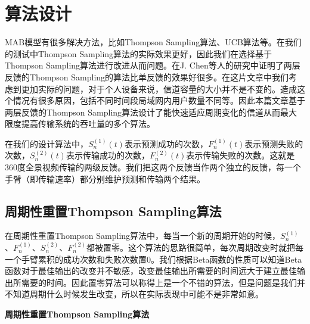 \chapter{算法设计}
MAB模型有很多解决方法，比如Thompson Sampling算法、UCB算法等。在我们的测试中Thompson Sampling算法的实际效果更好，因此我们在选择基于Thompson Sampling算法进行改进从而问题。在J. Chen等人\cite{ref8}的研究中证明了两层反馈的Thompson Sampling的算法比单反馈的效果好很多。在这片文章中我们考虑到更加实际的问题，对于个人设备来说，信道容量的大小并不是不变的。造成这个情况有很多原因，包括不同时间段局域网内用户数量不同等。因此本篇文章基于两层反馈的Thompson Sampling算法设计了能快速适应周期变化的信道从而最大限度提高传输系统的吞吐量的多个算法。


在我们的设计算法中，$S_{n}^{(1)}(t)$表示预测成功的次数，$F_{n}^{(1)}(t)$表示预测失败的次数，$S_{n}^{(2)}(t)$表示传输成功的次数，$F_{n}^{(2)}(t)$表示传输失败的次数。这就是360度全景视频传输的两级反馈。我们把这两个反馈当作两个独立的反馈，每一个手臂（即传输速率）都分别维护预测和传输两个结果。

\section{周期性重置Thompson Sampling算法}
在周期性重置Thompson Sampling算法中，每当一个新的周期开始的时候，$S_{n}^{(1)}$、$F_{n}^{(1)}$、$S_{n}^{(2)}$、$F_{n}^{(2)}$都被置零。这个算法的思路很简单，每次周期改变时就把每一个手臂累积的成功次数和失败次数置0。我们根据Beta函数的性质可以知道Beta函数对于最佳输出的改变并不敏感，改变最佳输出所需要的时间远大于建立最佳输出所需要的时间。因此置零算法可以称得上是一个不错的算法，但是问题是我们并不知道周期什么时候发生改变，所以在实际表现中可能不是非常如意。
\begin{algorithm}[h]
	\caption{\textbf{周期性重置Thompson Sampling算法}}
	\label{sgd}
\end{algorithm}

